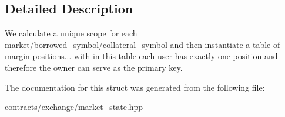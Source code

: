 \subsection{Detailed Description}
We calculate a unique scope for each market/borrowed\+\_\+symbol/collateral\+\_\+symbol and then instantiate a table of margin positions... with in this table each user has exactly one position and therefore the owner can serve as the primary key. 

The documentation for this struct was generated from the following file\+:\begin{DoxyCompactItemize}
\item 
contracts/exchange/market\+\_\+state.\+hpp\end{DoxyCompactItemize}
